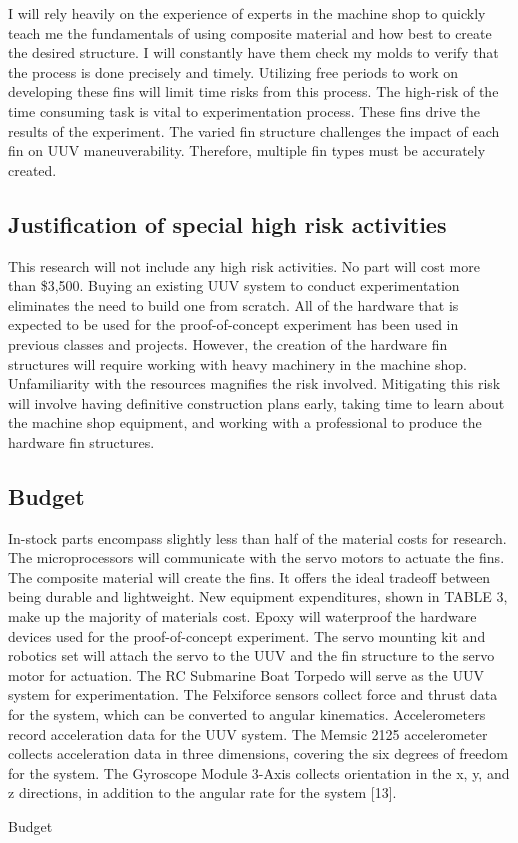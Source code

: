 \documentclass{IEEEtran}
\begin{document}
I will rely heavily on the experience of experts in the machine shop to quickly teach me the fundamentals of using composite material and how best to create the desired structure.  I will constantly have them check my molds to verify that the process is done precisely and timely.  Utilizing free periods to work on developing these fins will limit time risks from this process.  The high-risk of the time consuming task is vital to experimentation process.  These fins drive the results of the experiment.  The varied fin structure challenges the impact of each fin on UUV maneuverability.  Therefore, multiple fin types must be accurately created.

\subsection{Justification of special high risk activities}
This research will not include any high risk activities.  No part will cost more than \$3,500.  Buying an existing UUV system to conduct experimentation eliminates the need to build one from scratch.  All of the hardware that is expected to be used for the proof-of-concept experiment has been used in previous classes and projects.  However, the creation of the hardware fin structures will require working with heavy machinery in the machine shop.  Unfamiliarity with the resources magnifies the risk involved.  Mitigating this risk will involve having definitive construction plans early, taking time to learn about the machine shop equipment, and working with a professional to produce the hardware fin structures.  

\subsection{Budget}
In-stock parts encompass slightly less than half of the material costs for research.  The microprocessors will communicate with the servo motors to actuate the fins.  The composite material will create the fins.  It offers the ideal tradeoff between being durable and lightweight.  New equipment expenditures, shown in TABLE 3, make up the majority of materials cost.  Epoxy will waterproof the hardware devices used for the proof-of-concept experiment.  The servo mounting kit and robotics set will attach the servo to the UUV and the fin structure to the servo motor for actuation.  The RC Submarine Boat Torpedo will serve as the UUV system for experimentation.  The Felxiforce sensors collect force and thrust data for the system, which can be converted to angular kinematics.  Accelerometers record acceleration data for the UUV system.  The Memsic 2125 accelerometer collects acceleration data in three dimensions, covering the six degrees of freedom for the system.  The Gyroscope Module 3-Axis collects orientation in the x, y, and z directions, in addition to the angular rate for the system [13].    
\begin{table}
\caption{Budget}
\label{tab:2}
\end{table}
\end{document}
